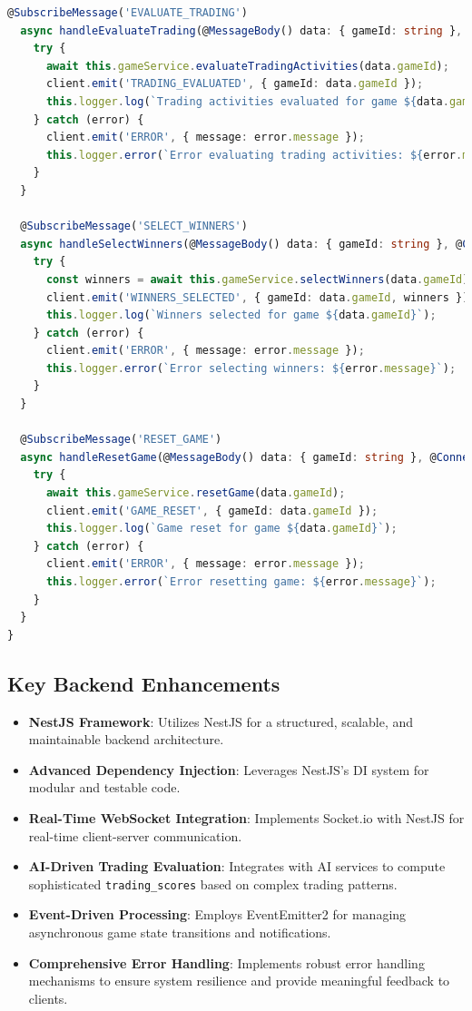 \documentclass[11pt,a4paper]{article}
\begin{document}
\begin{lstlisting}[language=TypeScript, caption={Game Gateway}]
  @SubscribeMessage('EVALUATE_TRADING')
  async handleEvaluateTrading(@MessageBody() data: { gameId: string }, @ConnectedSocket() client: Socket) {
    try {
      await this.gameService.evaluateTradingActivities(data.gameId);
      client.emit('TRADING_EVALUATED', { gameId: data.gameId });
      this.logger.log(`Trading activities evaluated for game ${data.gameId}`);
    } catch (error) {
      client.emit('ERROR', { message: error.message });
      this.logger.error(`Error evaluating trading activities: ${error.message}`);
    }
  }

  @SubscribeMessage('SELECT_WINNERS')
  async handleSelectWinners(@MessageBody() data: { gameId: string }, @ConnectedSocket() client: Socket) {
    try {
      const winners = await this.gameService.selectWinners(data.gameId);
      client.emit('WINNERS_SELECTED', { gameId: data.gameId, winners });
      this.logger.log(`Winners selected for game ${data.gameId}`);
    } catch (error) {
      client.emit('ERROR', { message: error.message });
      this.logger.error(`Error selecting winners: ${error.message}`);
    }
  }

  @SubscribeMessage('RESET_GAME')
  async handleResetGame(@MessageBody() data: { gameId: string }, @ConnectedSocket() client: Socket) {
    try {
      await this.gameService.resetGame(data.gameId);
      client.emit('GAME_RESET', { gameId: data.gameId });
      this.logger.log(`Game reset for game ${data.gameId}`);
    } catch (error) {
      client.emit('ERROR', { message: error.message });
      this.logger.error(`Error resetting game: ${error.message}`);
    }
  }
}
\end{lstlisting}

\subsection{Key Backend Enhancements}

\begin{itemize}
    \item \textbf{NestJS Framework}: Utilizes NestJS for a structured, scalable, and maintainable backend architecture.
    \item \textbf{Advanced Dependency Injection}: Leverages NestJS's DI system for modular and testable code.
    \item \textbf{Real-Time WebSocket Integration}: Implements Socket.io with NestJS for real-time client-server communication.
    \item \textbf{AI-Driven Trading Evaluation}: Integrates with AI services to compute sophisticated \texttt{trading\_scores} based on complex trading patterns.
    \item \textbf{Event-Driven Processing}: Employs EventEmitter2 for managing asynchronous game state transitions and notifications.
    \item \textbf{Comprehensive Error Handling}: Implements robust error handling mechanisms to ensure system resilience and provide meaningful feedback to clients.
\end{itemize}
\end{document}

